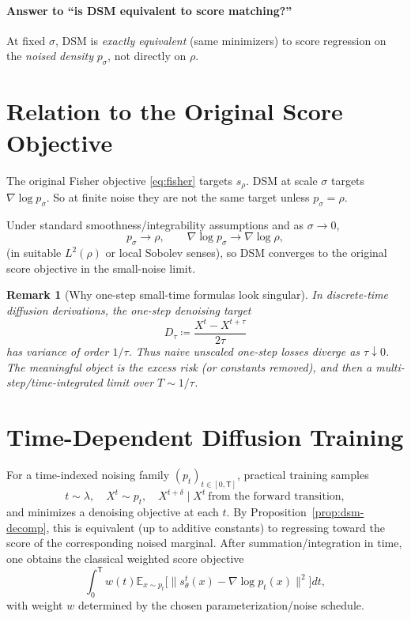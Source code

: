 \documentclass[11pt]{article}
\newcommand{\E}{\mathbb E}
\newtheorem{remark}{Remark}
\begin{document}
\paragraph{Answer to ``is DSM equivalent to score matching?''}
At fixed $\sigma$, DSM is \emph{exactly equivalent} (same minimizers) to score regression on the \emph{noised density} $p_\sigma$, not directly on $\rho$.

\section{Relation to the Original Score Objective}
The original Fisher objective \eqref{eq:fisher} targets $s_\rho$.
DSM at scale $\sigma$ targets $\nabla\log p_\sigma$.
So at finite noise they are not the same target unless $p_\sigma=\rho$.

Under standard smoothness/integrability assumptions and as $\sigma\to 0$,
\[
p_\sigma \to \rho,
\qquad
\nabla\log p_\sigma \to \nabla\log \rho,
\]
(in suitable $L^2(\rho)$ or local Sobolev senses), so DSM converges to the original score objective in the small-noise limit.

\begin{remark}[Why one-step small-time formulas look singular]
In discrete-time diffusion derivations, the one-step denoising target
\[
D_\tau \coloneqq \frac{X^t-X^{t+\tau}}{2\tau}
\]
has variance of order $1/\tau$.
Thus naive unscaled one-step losses diverge as $\tau\downarrow 0$.
The meaningful object is the excess risk (or constants removed), and then a multi-step/time-integrated limit over $T\sim 1/\tau$.
\end{remark}

\section{Time-Dependent Diffusion Training}
For a time-indexed noising family $(p_t)_{t\in[0,\mathsf T]}$, practical training samples
\[
t\sim \lambda,\quad X^t\sim p_t,\quad X^{t+\delta}\mid X^t\ \text{from the forward transition},
\]
and minimizes a denoising objective at each $t$.
By Proposition~\ref{prop:dsm-decomp}, this is equivalent (up to additive constants) to regressing toward the score of the corresponding noised marginal.
After summation/integration in time, one obtains the classical weighted score objective
\[
\int_0^{\mathsf T} w(t)
\E_{x\sim p_t}\!\big[\|s_\theta^t(x)-\nabla\log p_t(x)\|^2\big]dt,
\]
with weight $w$ determined by the chosen parameterization/noise schedule.
\end{document}
